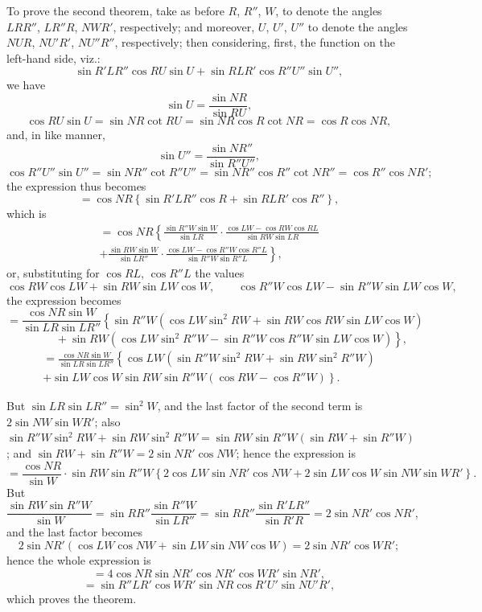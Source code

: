 \documentclass[11pt,a4paper]{book}
\theoremstyle{plain}
\begin{document}
To prove the second theorem, take as before $R$, $R''$, $W$, to denote the angles $LRR''$, $LR''R$, $NWR'$, respectively; and moreover, $U$, $U'$, $U''$ to denote the angles $NUR$, $NU'R'$, $NU''R''$, respectively; then considering, first, the function on the left-hand side, viz.:
\[
\sin R'LR''\cos RU\sin U+\sin RLR'\cos R''U''\sin U'',
\]
we have
\[
\sin U=\frac{\sin NR}{\sin RU},
\]
\[
\cos RU\sin U=\sin NR\cot RU=\sin NR\cos R\cot NR=\cos R\cos NR,
\]
and, in like manner,
\[
\sin U''=\frac{\sin NR''}{\sin R''U''},
\]
\[
\cos R''U''\sin U''=\sin NR''\cot R''U''=\sin NR''\cos R''\cot NR''=\cos R''\cos NR';
\]
the expression thus becomes
\[
=\cos NR\left\{\sin R'LR''\cos R+\sin RLR'\cos R''\right\},
\]
which is
\begin{multline*}
=\cos NR\left\{\frac{\sin R''W\sin W}{\sin LR}\cdot\frac{\cos LW-\cos RW\cos RL}{\sin RW\sin LR}\right.\\
\left.+\frac{\sin RW\sin W}{\sin LR''}\cdot\frac{\cos LW-\cos R''W\cos R''L}{\sin R''W\sin R''L}\right\},
\end{multline*}
or, substituting for $\cos RL$, $\cos R''L$ the values
\[
\cos RW\cos LW+\sin RW\sin LW\cos W,\qquad
\cos R''W\cos LW-\sin R''W\sin LW\cos W,
\]
the expression becomes
\[
=\frac{\cos NR\sin W}{\sin LR\sin LR''}
\left\{\sin R''W(\cos LW\sin^2RW+\sin RW\cos RW\sin LW\cos W)\right.
\]
\[
\left.\qquad\qquad+\sin RW(\cos LW\sin^2R''W-\sin R''W\cos R''W\sin LW\cos W)\right\},
\]
\begin{multline*}
=\frac{\cos NR\sin W}{\sin LR\sin LR''}
\left\{\cos LW(\sin R''W\sin^2RW+\sin RW\sin^2R''W)\right.\\
\left.+\sin LW\cos W\sin RW\sin R''W(\cos RW-\cos R''W)\right\}.
\end{multline*}

But $\sin LR\sin LR''=\sin^2W$, and the last factor of the second term is $2\sin NW\sin WR'$; also $\sin R''W\sin^2RW+\sin RW\sin^2R''W=\sin RW\sin R''W(\sin RW+\sin R''W)$; and $\sin RW+\sin R''W=2\sin NR'\cos NW$; hence the expression is
\[
=\frac{\cos NR}{\sin W}
\cdot\sin RW\sin R''W
\left\{2\cos LW\sin NR'\cos NW+2\sin LW\cos W\sin NW\sin WR'\right\}.
\]
But
\[
\frac{\sin RW\sin R''W}{\sin W}=\sin RR''\frac{\sin R''W}{\sin LR''}=\sin RR''\frac{\sin R'LR''}{\sin R'R}=2\sin NR'\cos NR',
\]
and the last factor becomes
\[
2\sin NR'(\cos LW\cos NW+\sin LW\sin NW\cos W)=2\sin NR'\cos WR';
\]
hence the whole expression is
\[
=4\cos NR\sin NR'\cos NR'\cos WR'\sin NR',
\]
\[
=\sin R''LR'\cos WR'\sin NR\cos R'U'\sin NU'R',
\]
which proves the theorem.
\end{document}
